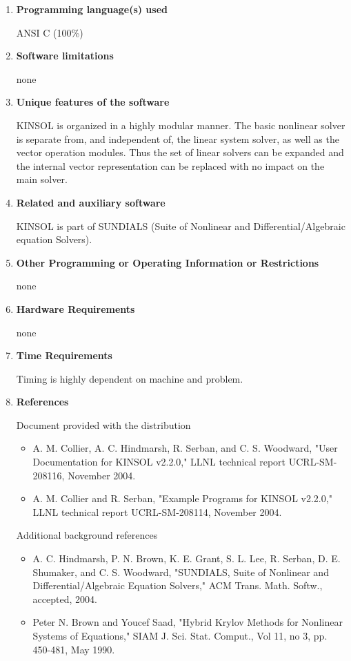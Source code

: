 \documentclass[12pt]{letter}
\begin{document}
\begin{letter}
\begin{enumerate}
\item {\bf Programming language(s) used}

ANSI C (100\%)

\item {\bf Software limitations}

none

\item {\bf Unique features of the software}

KINSOL is organized in a highly modular manner. The basic nonlinear solver
is separate from, and independent of, the linear system 
solver, as well as the vector operation modules. Thus the set of linear solvers can be 
expanded and the internal vector representation can be replaced with no impact on 
the main solver.


\item {\bf Related and auxiliary software}

KINSOL is part of SUNDIALS (Suite of Nonlinear and Differential/Algebraic equation 
Solvers). 

\item {\bf Other Programming or Operating Information or Restrictions}

none


\item {\bf Hardware Requirements}

none


\item {\bf Time Requirements}

Timing is highly dependent on machine and problem.


\item {\bf References}

Document provided with the distribution
\begin{itemize}
\item A. M. Collier, A. C. Hindmarsh, R. Serban, and C. S. Woodward,
    "User Documentation for KINSOL v2.2.0," LLNL technical report
    UCRL-SM-208116, November 2004. 
\item A. M. Collier and R. Serban, "Example Programs for KINSOL v2.2.0,"
    LLNL technical report UCRL-SM-208114, November 2004.
\end{itemize}
Additional background references
\begin{itemize}
\item A. C. Hindmarsh, P. N. Brown, K. E. Grant, S. L. Lee, R. Serban, 
    D. E. Shumaker, and C. S. Woodward, "SUNDIALS, Suite of Nonlinear and 
    Differential/Algebraic Equation Solvers," ACM Trans. Math. Softw., 
    accepted, 2004.
\item Peter N. Brown and Youcef Saad, "Hybrid Krylov Methods for
    Nonlinear Systems of Equations," SIAM J. Sci. Stat. Comput., 
    Vol 11, no 3, pp. 450-481, May 1990.  
\end{itemize}
\end{enumerate}

\end{letter}
\end{document}
